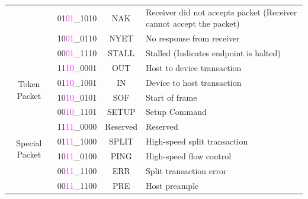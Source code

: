 \documentclass{article}
\begin{document}
\begin{itemize}
\begin{table}[H]
\begin{tabular}{|c|c|c|p{9cm}|}
                                                    & 01\textcolor{magenta}{01}\_1010 & NAK               & Receiver did not accepts packet (Receiver cannot accept the packet)  \\
                                                    & 10\textcolor{magenta}{01}\_0110 & NYET              & No response from receiver                                            \\
                                                    & 00\textcolor{magenta}{01}\_1110 & STALL             & Stalled (Indicates endpoint is halted)                               \\
                  \hline
                  \multirow{4}{*}{Token Packet}     & 11\textcolor{magenta}{10}\_0001 & OUT               & Host to device transaction                                           \\
                                                    & 01\textcolor{magenta}{10}\_1001 & IN                & Device to host transaction                                           \\
                                                    & 10\textcolor{magenta}{10}\_0101 & SOF               & Start of frame                                                       \\
                                                    & 00\textcolor{magenta}{10}\_1101 & SETUP             & Setup Command                                                        \\
                  \hline
                  \multirow{4}{*}{Special Packet}   & 11\textcolor{magenta}{11}\_0000 & Reserved          & Reserved                                                             \\
                                                    & 01\textcolor{magenta}{11}\_1000 & SPLIT             & High-speed split transaction                                         \\
                                                    & 10\textcolor{magenta}{11}\_0100 & PING              & High-speed flow control                                              \\
                                                    & 00\textcolor{magenta}{11}\_1100 & ERR               & Split transaction error                                              \\
                                                    & 00\textcolor{magenta}{11}\_1100 & PRE               & Host preample                                                        \\

\end{tabular}
\end{table}
\end{itemize}
\end{document}
